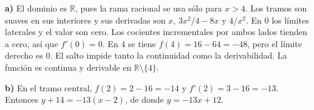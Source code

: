 \textbf{a)} El dominio es $\mathbb R$, pues la rama racional se usa sólo para $x>4$. Los tramos son suaves en sus interiores y sus derivadas son $x$, $3x^2/4-8x$ y $4/x^2$. En $0$ los límites laterales y el valor son cero. Los cocientes incrementales por ambos lados tienden a cero, así que $f'(0)=0$. En $4$ se tiene $f(4)=16-64=-48$, pero el límite derecho es $0$. El salto impide tanto la continuidad como la derivabilidad. La función es continua y derivable en $\mathbb R\setminus\{4\}$.

\textbf{b)} En el tramo central, $f(2)=2-16=-14$ y $f'(2)=3-16=-13$. Entonces $y+14=-13(x-2)$, de donde $\boxed{y=-13x+12}$.
